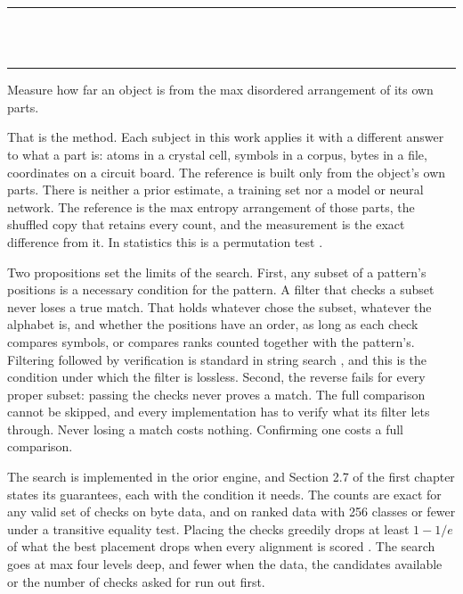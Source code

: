 \thispagestyle{empty}
\begin{center}
  \rule{\textwidth}{0.4pt}\\[0.9em]
  {\Large{}}\\[0.7em]
  \rule{\textwidth}{0.4pt}
\end{center}
\bigskip

\noindent Measure how far an object is from the max disordered arrangement of its own parts.

That is the method. Each subject in this work applies it with a different answer to what a part
is: atoms in a crystal cell, symbols in a corpus, bytes in a file, coordinates on a circuit board.
The reference is built only from the object's own parts. There is neither a prior estimate, a
training set nor a model or neural network. The reference is the max entropy arrangement of
those parts, the shuffled copy that retains every count, and the measurement is the exact difference
from it. In statistics this is a permutation test \cite{src:Good-2005}.

Two propositions set the limits of the search. First, any subset of a pattern's positions is a
necessary condition for the pattern. A filter that checks a subset never loses a true match. That
holds whatever chose the subset, whatever the alphabet is, and whether the positions have an
order, as long as each check compares symbols, or compares ranks counted together with the
pattern's. Filtering followed by verification is standard in string search \cite{src:Navarro}, and
this is the condition under which the filter is lossless. Second, the reverse fails for every proper
subset: passing the checks never proves a match. The full comparison cannot be skipped, and every
implementation has to verify what its filter lets through. Never losing a match costs nothing.
Confirming one costs a full comparison.

The search is implemented in the orior engine, and Section 2.7 of the first chapter states its
guarantees, each with the condition it needs. The
counts are exact for any valid set of checks on byte data, and on ranked data with 256 classes or
fewer under a transitive equality test. Placing the checks greedily drops at least \(1 - 1/e\) of
what the best placement drops when every alignment is scored \cite{src:Nemhauser-Wolsey-and-Fisher}.
The search goes at max four levels deep, and fewer when the data, the candidates available or the
number of checks asked for run out first.

